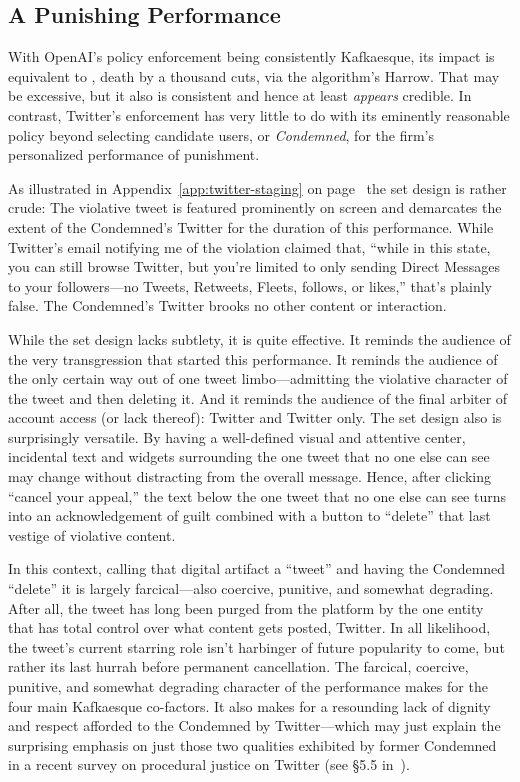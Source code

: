 \subsection{A Punishing Performance}

With OpenAI's policy enforcement being consistently Kafkaesque, its impact is
equivalent to \lingchi, death by a thousand cuts, via the algorithm's Harrow.
That may be excessive, but it also is consistent and hence at least
\emph{appears} credible. In contrast, Twitter's enforcement has very little to
do with its eminently reasonable policy beyond selecting candidate users, or
\emph{Condemned}, for the firm's personalized performance of punishment.

As illustrated in Appendix~\ref{app:twitter-staging} on
page~\pageref{app:twitter-staging} the set design is rather crude: The violative
tweet is featured prominently on screen and demarcates the extent of the
Condemned's Twitter for the duration of this performance. While Twitter's email
notifying me of the violation claimed that, ``while in this state, you can still
browse Twitter, but you're limited to only sending Direct Messages to your
followers---no Tweets, Retweets, Fleets, follows, or likes,'' that's plainly
false. The Condemned's Twitter brooks no other content or interaction.

While the set design lacks subtlety, it is quite effective. It reminds the
audience of the very transgression that started this performance. It reminds the
audience of the only certain way out of one tweet limbo---admitting the
violative character of the tweet and then deleting it. And it reminds the
audience of the final arbiter of account access (or lack thereof): Twitter and
Twitter only. The set design also is surprisingly versatile. By having a
well-defined visual and attentive center, incidental text and  widgets
surrounding the one tweet that no one else can see may change without
distracting from the overall message. Hence, after clicking ``cancel your
appeal,'' the text below the one tweet that no one else can see turns into an
acknowledgement of guilt combined with a button to ``delete'' that last vestige
of violative content.

In this context, calling that digital artifact a ``tweet'' and having the
Condemned ``delete'' it is largely farcical---also coercive, punitive, and
somewhat degrading. After all, the tweet has long been purged from the platform
by the one entity that has total control over what content gets posted, Twitter.
In all likelihood, the tweet's current starring role isn't harbinger of future
popularity to come, but rather its last hurrah before permanent cancellation.
The farcical, coercive, punitive, and somewhat degrading character of the
performance makes for the four main Kafkaesque co-factors. It also makes for a
resounding lack of dignity and respect afforded to the Condemned by
Twitter---which may just explain the surprising emphasis on just those two
qualities exhibited by former Condemned in a recent survey on procedural justice
on Twitter (see \S5.5 in~\cite{KatsarosTylerea2022}).

